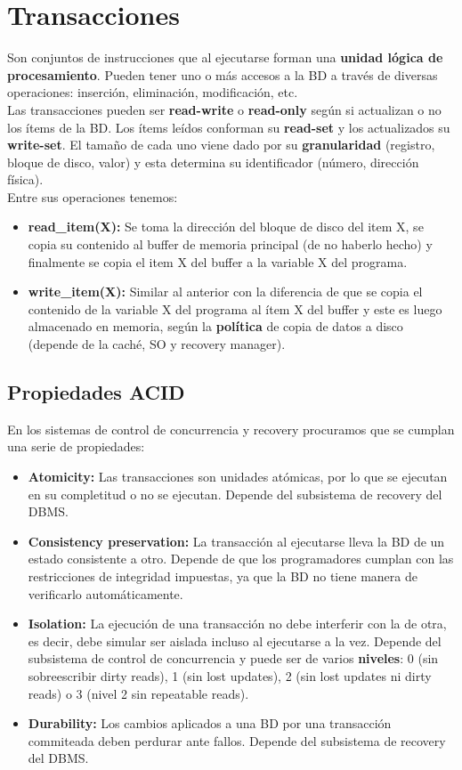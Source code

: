﻿\section*{Transacciones}
Son conjuntos de instrucciones que al ejecutarse forman una \textbf{unidad lógica de procesamiento}. Pueden tener uno o más accesos a la BD a través de diversas operaciones: inserción, eliminación, modificación, etc. \\
Las transacciones pueden ser \textbf{read-write} o \textbf{read-only} según si actualizan o no los ítems de la BD. Los ítems leídos conforman su \textbf{read-set} y los actualizados su \textbf{write-set}. El tamaño de cada uno viene dado por su \textbf{granularidad} (registro, bloque de disco, valor) y esta determina su identificador (número, dirección física). \\
Entre sus operaciones tenemos:
\begin{itemize}
    \item \textbf{read\_item(X):} Se toma la dirección del bloque de disco del item X, se copia su contenido al buffer de memoria principal (de no haberlo hecho) y finalmente se copia el item X del buffer a la variable X del programa.
    \item \textbf{write\_item(X):} Similar al anterior con la diferencia de que se copia el contenido de la variable X del programa al ítem X del buffer y este es luego almacenado en memoria, según la \textbf{política} de copia de datos a disco (depende de la caché, SO y recovery manager).
\end{itemize}

\subsection*{Propiedades ACID}
En los sistemas de control de concurrencia y recovery procuramos que se cumplan una serie de propiedades:
\begin{itemize}
    \item \textbf{Atomicity:} Las transacciones son unidades atómicas, por lo que se ejecutan en su completitud o no se ejecutan. Depende del subsistema de recovery del DBMS.
    \item \textbf{Consistency preservation:} La transacción al ejecutarse lleva la BD de un estado consistente a otro. Depende de que los programadores cumplan con las restricciones de integridad impuestas, ya que la BD no tiene manera de verificarlo automáticamente.
    \item \textbf{Isolation:} La ejecución de una transacción no debe interferir con la de otra, es decir, debe simular ser aislada incluso al ejecutarse a la vez. Depende del subsistema de control de concurrencia y puede ser de varios \textbf{niveles}: 0 (sin sobreescribir dirty reads), 1 (sin lost updates), 2 (sin lost updates ni dirty reads) o 3 (nivel 2 sin repeatable reads).
    \item \textbf{Durability:} Los cambios aplicados a una BD por una transacción commiteada deben perdurar ante fallos. Depende del subsistema de recovery del DBMS.
\end{itemize}

